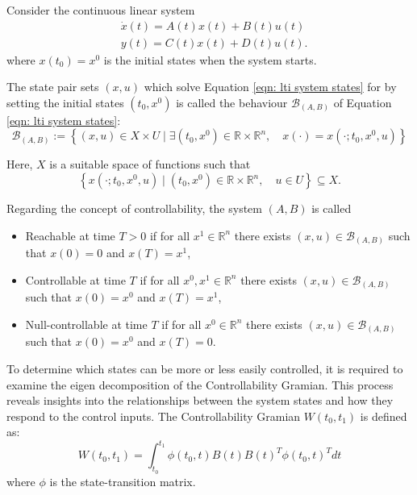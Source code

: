Consider the continuous linear system
\begin{equation}
\label{eqn: lti system states}
\begin{aligned}
& \dot{{x}}(t)=A(t) {x}(t)+B(t) {u}(t) \\
& {y}(t)=C(t) {x}(t)+D(t) {u}(t) .
\end{aligned}
\end{equation}
where ${x}(t_0)=x^0$ is the initial states when the system starts.

The state pair sets $(x, u)$ which solve Equation \ref{eqn: lti system states} for by setting the initial states $\left(t_0, x^0\right)$ is called the behaviour $\mathcal{B}_{(A, B)}$ of Equation \ref{eqn: lti system states}:
\begin{equation}
\mathcal{B}_{(A, B)}:=\left\{(x, u) \in X \times U \mid \exists\left(t_0, x^0\right) \in \mathbb{R} \times \mathbb{R}^n, \quad x(\cdot)=x\left(\cdot ; t_0, x^0, u\right)\right\}
\end{equation}

Here, $X$ is a suitable space of functions such that
\begin{equation}
\left\{x\left(\cdot ; t_0, x^0, u\right) \mid\left(t_0, x^0\right) \in \mathbb{R} \times \mathbb{R}^n, \quad u \in U\right\} \subseteq X .
\end{equation}

Regarding the concept of controllability, the system $(A, B)$ is called 
\begin{itemize}
    \item Reachable at time $T>0$ if for all $x^1 \in \mathbb{R}^n$ there exists $(x, u) \in \mathcal{B}_{(A, B)}$ such that $x(0)=0$ and $x(T)=x^1$,
    \item Controllable at time $T$ if for all $x^0, x^1 \in \mathbb{R}^n$ there exists $(x, u) \in \mathcal{B}_{(A, B)}$ such that $x(0)=x^0$ and $x(T)=x^1$,
    \item Null-controllable at time $T$ if for all $x^0 \in \mathbb{R}^n$ there exists $(x, u) \in \mathcal{B}_{(A, B)}$ such that $x(0)=x^0$ and $x(T)=0$.
\end{itemize}

To determine which states can be more or less easily controlled, it is required to examine the eigen decomposition of the Controllability Gramian. This process reveals insights into the relationships between the system states and how they respond to the control inputs. The Controllability Gramian $W\left(t_0, t_1\right)$ is defined as:
\begin{equation}
\label{eqn_controllability_gramian}
W\left(t_0, t_1\right)=\int_{t_0}^{t_1} \phi\left(t_0, t\right) B(t) B(t)^T \phi\left(t_0, t\right)^T d t
\end{equation}
where $\phi$ is the state-transition matrix. 

